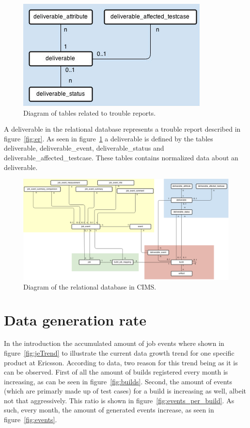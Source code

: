 \begin{figure}[h!]
\centering
\includegraphics[scale=0.5]{figure/deliverable.jpg}
\caption{Diagram of tables related to trouble reports.}
\label{fig:deliverable}
\end{figure}
A deliverable in the relational database represents a trouble report described in figure~\ref{fig:er}. As seen in figure~\ref{fig:deliverable} a deliverable is defined by the tables deliverable, deliverable\_event, deliverable\_status and deliverable\_affected\_testcase. These tables contains normalized data about an deliverable. 


\begin{figure}[h!]
\centering
\includegraphics[scale=0.5, angle=90]{figure/sql.png}
\caption{Diagram of the relational database in CIMS.}
\label{fig:sql}
\end{figure}

\section{Data generation rate}
In the introduction the accumulated amount of job events where shown in figure~\ref{fig:jeTrend} to illustrate the current data growth trend for one specific product at Ericsson. According to data, two reason for this trend being as it is can be observed. First of all the amount of builds registered every month is increasing, as can be seen in figure~\ref{fig:builds}. Second, the amount of events (which are primarly made up of test cases) for a build is increasing as well, albeit not that aggressively. This ratio is shown in figure~\ref{fig:events_per_build}. As such, every month, the amount of generated events increase, as seen in figure~\ref{fig:events}.

